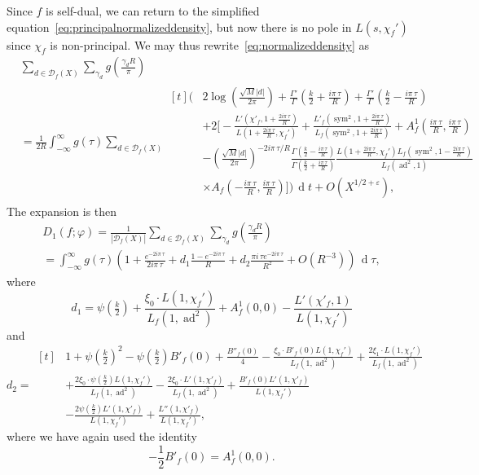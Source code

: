 \documentclass[11pt,reqno]{amsart} \usepackage{fullpage}
\newcommand{\vep}{\varepsilon}
\renewcommand{\d}[1]{\,\operatorname*{d}\!{#1}}
\newcommand\be{\begin{equation}}
\newcommand\ee{\end{equation}}
\newcommand{\Lad}[1]{L_f\left(#1,\ad^2\right)}
\newcommand{\Lchi}[2][]{L(#2,\chi_f#1)}
\DeclareMathOperator{\sym}{sym}
\DeclareMathOperator{\ad}{ad}
\newcommand{\D}{\mathcal D_f}
\numberwithin{equation}{section}
\begin{document}
Since $f$ is self-dual, we can return to the simplified
equation~\eqref{eq:principalnormalizeddensity}, but now there is no pole in
$\Lchi[']{s}$ since $\chi_f$ is non-principal. We may thus
rewrite~\eqref{eq:normalizeddensity} as
\be\label{eq:principalnormalizeddensity}\begin{aligned}
  &\sum_{d\in\D(X)}
  \sum_{\gamma_d}g\left(\frac{\gamma_d R}\pi\right) \\
  &=\frac1{2R}\int_{-\infty}^\infty g(\tau)\sum_{d\in\D(X)}
  \begin{aligned}[t]\Bigg(
    &2\log\left(\frac{\sqrt M|d|}{2\pi}\right)
    +\frac{\Gamma'}{\Gamma}\left(\frac k2+\frac{i\pi\,\tau}{R}\right)
    +\frac{\Gamma'}{\Gamma}\left(\frac k2-\frac{i\pi\,\tau}{R}\right) \\
    &+2\Bigg[-\frac{L'\left(\chi'_f,1+\frac{2i\pi\,\tau}{R}\right)}
    {\Lchi[']{1+\frac{2i\pi\,\tau}{R}}}
    +\frac{L'_f\left(\sym^2,1+\frac{2i\pi\,\tau}{R}\right)}
    {L_f\left(\sym^2,1+\frac{2i\pi\,\tau}{R}\right)}
    +A_f^1\left(\frac{i\pi\,\tau}{R},\frac{i\pi\,\tau}{R}\right) \\
    &-\left(\frac{\sqrt M |d|}{2\pi}\right)^{-2i\pi\,\tau/R}
    \frac{\Gamma\left(\frac k2-\frac{i\pi\,\tau}{R}\right)}
    {\Gamma\left(\frac k2+\frac{i\pi\,\tau}{R}\right)}
    \frac{\Lchi[']{1+\frac{2i\pi\,\tau}{R}}
      L_f\left(\sym^2,1-\frac{2i\pi\,\tau}{R}\right)}{L_f(\ad^2,1)} \\
    &\times{A}_f\left(-\frac{i\pi\,\tau}{R},\frac{i\pi\,\tau}{R}\right)
    \Bigg]
    \Bigg) \d t
    +O(X^{1/2+\vep}),\end{aligned}
\end{aligned}\ee
The expansion is then
\be\label{eq:unsimplifiedcmexpansion}\begin{multlined}
  D_1(f;\varphi)
  =
  \frac1 {\left|\D(X)\right|}\sum_{d\in\D(X)}
  \sum_{\gamma_d}g\left(\frac{\gamma_d R}\pi\right) \\
  =
  \int_{-\infty}^\infty g(\tau)
  \left(
    1+\frac{e^{-2i\pi\,\tau}}{2i\pi\,\tau}+d_1\frac{1-e^{-2i\pi\,\tau}}R
    +d_2\frac{\pi i\,\tau e^{-2i\pi\,\tau}}{R^2}+O\left(R^{-3}\right)
  \right)\d\tau,
\end{multlined}\ee
where
\be\label{eq:d1def}
d_1=\psi\left(\tfrac k2\right)+\frac{\xi_0\cdot\Lchi[']{1}}{\Lad{1}}+A^1_f(0,0)
-\frac{L'(\chi'_f,1)}{\Lchi[']{1}}\ee
and
\be\label{eq:d2def} d_2=
\begin{aligned}[t]
  &1+\psi\left(\tfrac k2\right)^2 -\psi\left(\tfrac k2\right)B'_f(0) +\frac{B''_f(0)}4
  -\frac{\xi_0\cdot B'_f(0)\Lchi[']{1}}{\Lad{1}} +\frac{2\xi_1\cdot\Lchi[']{1}}{\Lad{1}} \\
  &+\frac{2\xi_0\cdot\psi\left(\tfrac k2\right)\Lchi[']{1}}{\Lad{1}}
  -\frac{2\xi_0\cdot L'(1,\chi'_f)}{\Lad{1}}+\frac{B'_f(0)L'(1,\chi'_f)}{\Lchi[']{1}} \\
  & -\frac{2\psi\left(\tfrac k2\right)L'(1,\chi'_f)}{\Lchi[']{1}}
  +\frac{L''(1,\chi'_f)}{\Lchi[']{1}},
  \end{aligned}\ee
where we have again used the identity \be -\frac12B'_f(0)=A^1_f(0,0).\ee
\end{document}
